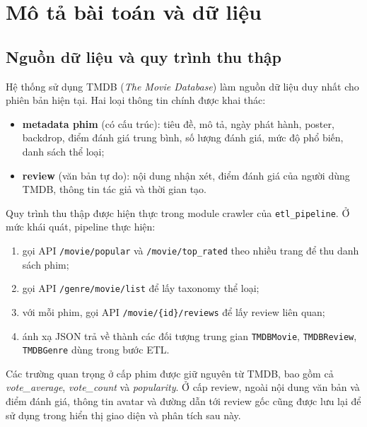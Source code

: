 \chapter{Mô tả bài toán và dữ liệu}

\section{Nguồn dữ liệu và quy trình thu thập}
Hệ thống sử dụng TMDB (\textit{The Movie Database}) \cite{tmdb} làm nguồn dữ liệu duy nhất cho phiên bản hiện tại. Hai loại thông tin chính được khai thác:
\begin{itemize}
    \item \textbf{metadata phim} (có cấu trúc): tiêu đề, mô tả, ngày phát hành, poster, backdrop, điểm đánh giá trung bình, số lượng đánh giá, mức độ phổ biến, danh sách thể loại;
    \item \textbf{review} (văn bản tự do): nội dung nhận xét, điểm đánh giá của người dùng TMDB, thông tin tác giả và thời gian tạo.
\end{itemize}

Quy trình thu thập được hiện thực trong module crawler của \texttt{etl\_pipeline}. Ở mức khái quát, pipeline thực hiện:
\begin{enumerate}[label=\arabic*.]
    \item gọi API \texttt{/movie/popular} và \texttt{/movie/top\_rated} theo nhiều trang để thu danh sách phim;
    \item gọi API \texttt{/genre/movie/list} để lấy taxonomy thể loại;
    \item với mỗi phim, gọi API \texttt{/movie/\{id\}/reviews} để lấy review liên quan;
    \item ánh xạ JSON trả về thành các đối tượng trung gian \texttt{TMDBMovie}, \texttt{TMDBReview}, \texttt{TMDBGenre} dùng trong bước ETL.
\end{enumerate}

Các trường quan trọng ở cấp phim được giữ nguyên từ TMDB, bao gồm cả \textit{vote\_average}, \textit{vote\_count} và \textit{popularity}. Ở cấp review, ngoài nội dung văn bản và điểm đánh giá, thông tin avatar và đường dẫn tới review gốc cũng được lưu lại để sử dụng trong hiển thị giao diện và phân tích sau này.

